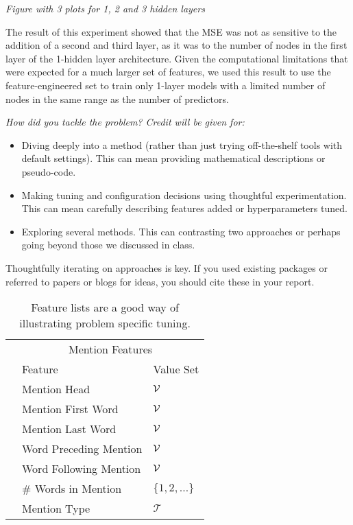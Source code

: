 \documentclass[11pt]{article}
\begin{document}
\begin{enumerate}
\begin{enumerate}
\emph{Figure with 3 plots for 1, 2 and 3 hidden layers}

The result of this experiment showed that the MSE was not as sensitive to the addition of a second and third layer, as it was to the number of nodes in the first layer of the 1-hidden layer architecture. Given the computational limitations that were expected for a much larger set of features, we used this result to use the feature-engineered set to train only 1-layer models with a limited number of nodes in the same range as the number of predictors.


\end{enumerate}

\end{enumerate}


{\itshape
How did you tackle the problem? Credit will be given for:

  \begin{itemize}
  \item Diving deeply into a method (rather than just trying
    off-the-shelf tools with default settings). This can mean 
    providing mathematical descriptions or pseudo-code.
  \item Making tuning and configuration decisions using thoughtful experimentation.  
    This can mean carefully describing features added or hyperparameters tuned.
  \item Exploring several methods. This can contrasting two approaches
    or perhaps going beyond those we discussed in class.
  \end{itemize}

  \noindent Thoughtfully iterating on approaches is key.
  If you used existing packages or referred to papers or blogs for ideas,
  you should cite these in your report. 

  \begin{table}
    \centering
    \begin{tabular}{@{}lll@{}}
      &\multicolumn{2}{c}{Mention Features  } \\
      & Feature & Value Set\\
      \midrule
      & Mention Head & $\mathcal{V}$ \\
      & Mention First Word & $\mathcal{V}$ \\
      & Mention Last Word & $\mathcal{V}$ \\
      & Word Preceding Mention & $\mathcal{V}$ \\
      & Word Following Mention & $\mathcal{V}$\\
      & \# Words in Mention & $\{1, 2, \ldots \}$ \\
      & Mention Type & $\mathcal{T}$ \\
      \bottomrule
      
    \end{tabular}
    \caption{Feature lists are a good way of illustrating problem specific tuning.}
  \end{table}

}
\end{document}
